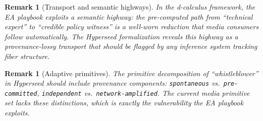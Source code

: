 \documentclass[11pt,a4paper]{article}
\newtheorem{remark}[definition]{Remark}
\begin{document}
\begin{remark}[Transport and semantic highways]
In the d-calculus framework, the EA playbook exploits a \emph{semantic highway}:
the pre-computed path from ``technical expert'' to ``credible policy witness''
is a well-worn reduction that media consumers follow automatically. The
Hyperseed formalization reveals this highway as a provenance-lossy transport
that should be flagged by any inference system tracking fiber structure.
\end{remark}

\begin{remark}[Adaptive primitives]
The primitive decomposition of ``whistleblower'' in Hyperseed should include
provenance components: \texttt{spontaneous} vs.\ \texttt{pre-committed},
\texttt{independent} vs.\ \texttt{network-amplified}. The current media
primitive set lacks these distinctions, which is exactly the vulnerability
the EA playbook exploits.
\end{remark}
\end{document}
